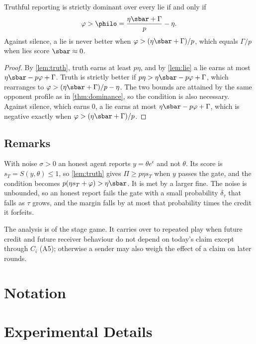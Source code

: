 \begin{proposition}
  \label{prop:fine}
  Truthful reporting is strictly dominant over every lie if and only if
  \[
    \varphi>\philo=\frac{\eta\sbar+\Gamma}{p}-\eta .
  \]
  Against silence, a lie is never better when $\varphi>(\eta\sbar+\Gamma)/p$, which equals $\Gamma/p$ when lies score $\sbar\approx0$.
\end{proposition}
\begin{proof}
  By \cref{lem:truth}, truth earns at least $p\eta$, and by \cref{lem:lie} a lie earns at most $\eta\sbar-p\varphi+\Gamma$. Truth is strictly better if $p\eta>\eta\sbar-p\varphi+\Gamma$, which rearranges to $\varphi>(\eta\sbar+\Gamma)/p-\eta$. The two bounds are attained by the same opponent profile as in \cref{thm:dominance}, so the condition is also necessary. Against silence, which earns $0$, a lie earns at most $\eta\sbar-p\varphi+\Gamma$, which is negative exactly when $\varphi>(\eta\sbar+\Gamma)/p$.
\end{proof}

\subsection{Remarks}
\begin{remark}
  \label{rem:noise}
  With noise $\sigma>0$ an honest agent reports $y=\theta e^{\epsilon}$ and not $\theta$. Its score is $s_T=S(y,\theta)\le1$, so \cref{lem:truth} gives $\Pi\ge p\eta s_T$ when $y$ passes the gate, and the condition becomes $p(\eta s_T+\varphi)>\eta\sbar$. It is met by a larger fine. The noise is unbounded, so an honest report fails the gate with a small probability $\delta_\tau$ that falls as $\tau$ grows, and the margin falls by at most that probability times the credit it forfeits.
\end{remark}

\begin{remark}
  The analysis is of the stage game. It carries over to repeated play when future credit and future receiver behaviour do not depend on today's claim except through $C_i$ (A5); otherwise a sender may also weigh the effect of a claim on later rounds.
\end{remark}

\section{Notation}
\label{app:notation}

\section{Experimental Details}
\label{app:details}
